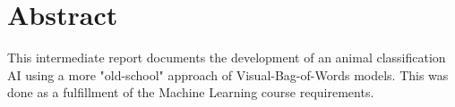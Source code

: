 \chapter*{Abstract}

This intermediate report documents the development of an animal classification AI using a more "old-school" approach of Visual-Bag-of-Words models.
This was done as a fulfillment of the Machine Learning course requirements.
